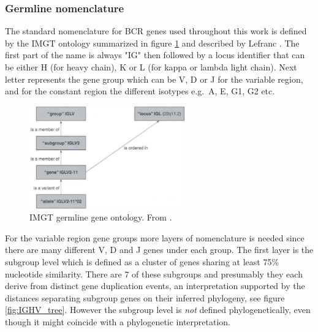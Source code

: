 \subsubsection{Germline nomenclature}
The standard nomenclature for BCR genes used throughout this work is defined by the IMGT ontology summarized in figure \ref{fig:IMGT_classification} and described by Lefranc \cite{lefranc2001nomenclature}.
The first part of the name is always "IG" then followed by a locus identifier that can be either H (for heavy chain), K or L (for kappa or lambda light chain).
Next letter represents the gene group which can be V, D or J for the variable region, and for the constant region the different isotypes e.g.\ A, E, G1, G2 etc.

\begin{figure}[ht]
    \centering
    \includegraphics[width=0.6\textwidth]{figures/IMGT_classification.png}
    \caption{
        \label{fig:IMGT_classification}
        IMGT germline gene ontology.
        From \cite{giudicelli1999ontology}.
    }
\end{figure}


For the variable region gene groups more layers of nomenclature is needed since there are many different V, D and J genes under each group.
The first layer is the subgroup level which is defined as a cluster of genes sharing at least 75\% nucleotide similarity.
There are 7 of these subgroups and presumably they each derive from distinct gene duplication events, an interpretation supported by the distances separating subgroup genes on their inferred phylogeny, see figure \ref{fig:IGHV_tree}.
However the subgroup level is \textit{not} defined phylogenetically, even though it might coincide with a phylogenetic interpretation.

